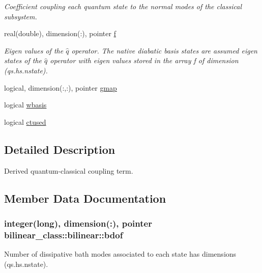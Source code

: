 \begin{DoxyCompactItemize}
\begin{DoxyCompactList}\small\item\em Coefficient coupling each quantum state to the normal modes of the classical subsystem. \end{DoxyCompactList}\item 
real(double), dimension(\-:), pointer \hyperlink{structbilinear__class_1_1bilinear_a809699845e36e344b7aeb51642c333ec}{f}
\begin{DoxyCompactList}\small\item\em Eigen values of the $ \hat q $ operator. The native diabatic basis states are assumed eigen states of the $ \hat q $ operator with eigen values stored in the array f of dimension (qs.\-hs.\-nstate). \end{DoxyCompactList}\item 
logical, dimension(\-:,\-:), pointer \hyperlink{structbilinear__class_1_1bilinear_aeb06e78f97c5cdac0c83422ec087e2e0}{gmap}
\item 
logical \hyperlink{structbilinear__class_1_1bilinear_a78eec2ff8a3e1de38eb02ceeb108ad15}{wbasis}
\item 
logical \hyperlink{structbilinear__class_1_1bilinear_aba7556e23595f003ffcf20327dc18f3e}{ctused}
\end{DoxyCompactItemize}


\subsection{Detailed Description}
Derived quantum-\/classical coupling term. 

\subsection{Member Data Documentation}
\hypertarget{structbilinear__class_1_1bilinear_a78e65d82cd358d5dfa19b780ab877fa0}{
\subsubsection[{bdof}]{\setlength{\rightskip}{0pt plus 5cm}integer(long), dimension(\-:), pointer bilinear\-\_\-class\-::bilinear\-::bdof\hspace{0.3cm}{\ttfamily [private]}}}\label{structbilinear__class_1_1bilinear_a78e65d82cd358d5dfa19b780ab877fa0}


Number of dissipative bath modes associated to each state has dimensions (qs.\-hs.\-nstate). 

